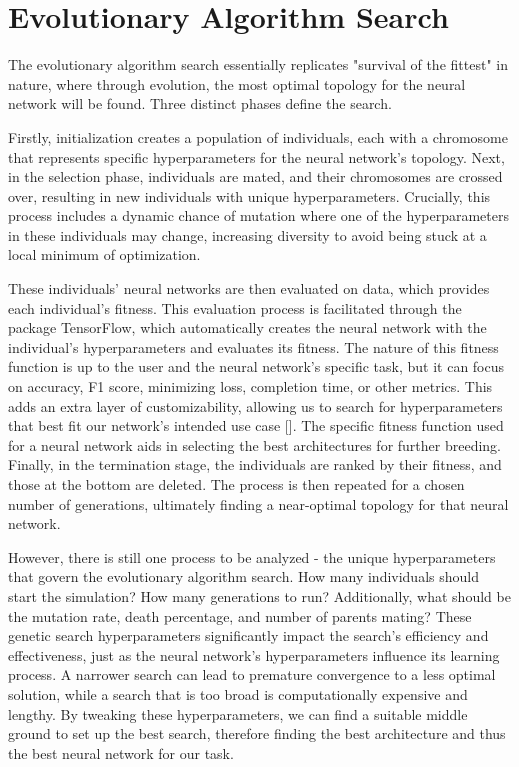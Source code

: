\vspace{10pt}
\section{Evolutionary Algorithm Search}
The evolutionary algorithm search essentially replicates "survival of the fittest" in nature, where through evolution, the most optimal topology for the neural network will be found. Three distinct phases define the search. 

Firstly, initialization creates a population of individuals, each with a chromosome that represents specific hyperparameters for the neural network's topology. Next, in the selection phase, individuals are mated, and their chromosomes are crossed over, resulting in new individuals with unique hyperparameters. Crucially, this process includes a dynamic chance of mutation where one of the hyperparameters in these individuals may change, increasing diversity to avoid being stuck at a local minimum of optimization.

These individuals' neural networks are then evaluated on data, which provides each individual's fitness. This evaluation process is facilitated through the package TensorFlow, which automatically creates the neural network with the individual's hyperparameters and evaluates its fitness. The nature of this fitness function is up to the user and the neural network's specific task, but it can focus on accuracy, F1 score, minimizing loss, completion time, or other metrics. This adds an extra layer of customizability, allowing us to search for hyperparameters that best fit our network's intended use case [\cite{example7}]. The specific fitness function used for a neural network aids in selecting the best architectures for further breeding. Finally, in the termination stage, the individuals are ranked by their fitness, and those at the bottom are deleted. The process is then repeated for a chosen number of generations, ultimately finding a near-optimal topology for that neural network. 

However, there is still one process to be analyzed - the unique hyperparameters that govern the evolutionary algorithm search. How many individuals should start the simulation? How many generations to run? Additionally, what should be the mutation rate, death percentage, and number of parents mating? These genetic search hyperparameters significantly impact the search's efficiency and effectiveness, just as the neural network's hyperparameters influence its learning process. A narrower search can lead to premature convergence to a less optimal solution, while a search that is too broad is computationally expensive and lengthy. By tweaking these hyperparameters, we can find a suitable middle ground to set up the best search, therefore finding the best architecture and thus the best neural network for our task.

